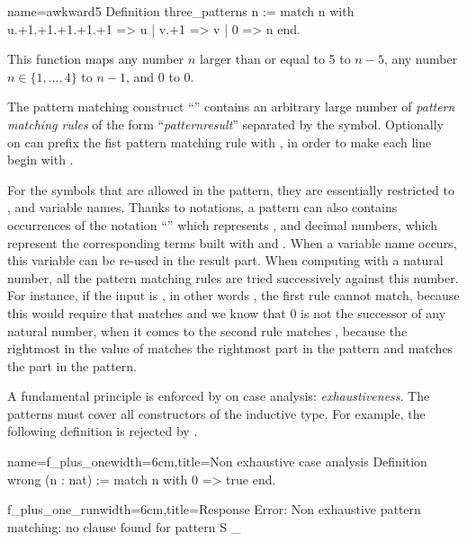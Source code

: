 \begin{coq}{name=awkward5}{}
Definition three_patterns n :=
  match n with
    u.+1.+1.+1.+1.+1 => u
  | v.+1 => v
  | 0 => n
  end.
\end{coq}
This function maps any number \(n\) larger than or equal to 5 to \(n-5\),
any number \(n \in \{1, \ldots, 4\}\) to \(n-1\), and \(0\) to \(0\).

The pattern matching construct ``'' contains an
arbitrary large number of {\em pattern matching rules} of the form
``\emph{pattern}\C{ =>$~$}\emph{result}'' 
separated by the \C{|} symbol.  Optionally on can
prefix the fist pattern matching rule with \C{|}, in order to make each line
begin with \C{|}.

For the symbols that are allowed
in the pattern, they are essentially restricted to ,  and
variable names.  Thanks to notations, a pattern can also contains
occurrences of the notation ``'' which represents , and
decimal numbers, which represent the corresponding terms built with
 and .  When a variable name occurs, this variable can be
re-used in the result part.  When computing with a natural number, all
the pattern matching rules are tried successively against this number.
For instance, if the input is , in other words , the first
rule cannot match, because this would require that  matches
 and we know that \(0\) is not the successor of any
natural number, when it comes to the second rule  matches
, because the rightmost  in the value of  matches
the rightmost  part in the pattern and  matches the  part
in the pattern.

A fundamental principle is enforced by \Coq{} on case analysis:
\emph{exhaustiveness}.  The patterns must cover all constructors of
the inductive type.  For example, the following definition is
rejected by \Coq{}.

\begin{coq}{name=f_plus_one}{width=6cm,title=Non exhaustive case analysis}
Definition wrong (n : nat) :=
  match n with 0 => true end.
$~$
\end{coq}
\begin{coqout}{f_plus_one_run}{width=6cm,title=Response}
Error: Non exhaustive pattern
matching: no clause found for
pattern S _
\end{coqout}

